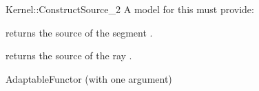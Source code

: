 \begin{ccRefFunctionObjectConcept}{Kernel::ConstructSource_2}
A model for this must provide:


 {returns the source of
  the segment .}

 {returns the source of
  the ray .}

\ccRefines
AdaptableFunctor (with one argument)

\ccSeeAlso
{}\\

\end{ccRefFunctionObjectConcept}

